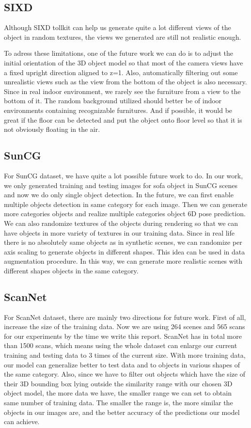 \subsection{SIXD}
\label{sec:SIXD}
Although SIXD tollkit can help us generate quite a lot different views of the object in random textures, the views we generated are still not realistic enough.

To adress these limitations, one of the future work we can do is to adjust the initial orientation of the 3D object model so that most of the camera views have a fixed upright direction aligned to z=1. Also, automatically filtering out some unrealistic views such as the view from the bottom of the object is also necessary. Since in real indoor environment, we rarely see the furniture from a view to the bottom of it. The random background utilized should better be of indoor environments containing recognizable furnitures. And if possible, it would be great if the floor can be detected and put the object onto floor level so that it is not obviously floating in the air.

\subsection{SunCG}

For SunCG dataset, we have quite a lot possible future work to do. In our work, we only generated training and testing images for sofa object in SunCG scenes and now we do only single object detection. In the future, we can first enable multiple objects detection in same category for each image. Then we can generate more categories objects and realize multiple categories object 6D pose prediction. We can also randomize textures of the objects during rendering so that we can have objects in more variety of textures in our training data. Since in real life there is no absolutely same objects as in synthetic scenes, we can randomize per axis scaling to generate objects in different shapes. This idea can be used in data augmentation procedure. In this way, we can generate more realistic scenes with different shapes objects in the same category.

\subsection{ScanNet}

For ScanNet dataset, there are mainly two directions for future work. First of all, increase the size of the training data. Now we are using 264 scenes and 565 scans for our experiments by the time we write this report. ScanNet has in total more than 1500 scans, which means using the whole dataset can enlarge our current training and testing data to 3 times of the current size. With more training data, our model can generalize better to test data and to objects in various shapes of the same category. Also, since we have to filter out objects which have the size of their 3D bounding box lying outside the similarity range with our chosen 3D object model, the more data we have, the smaller range we can set to obtain same number of training data. The smaller the range is, the more similar the objects in our images are, and the better accuracy of the predictions our model can achieve.

